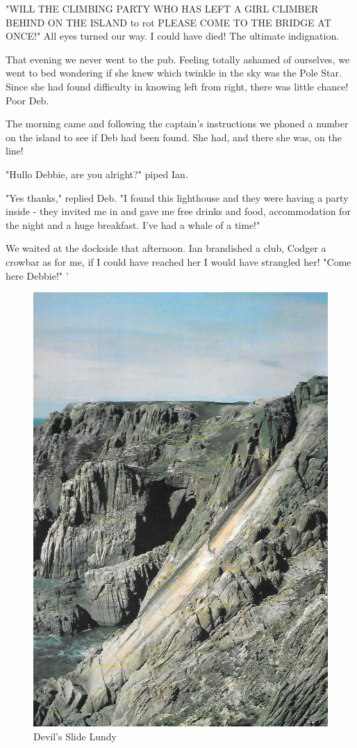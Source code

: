\documentclass[a5paper,openany,font 10pt]{scrbook}
\begin{document}
"WILL THE CLIMBING PARTY WHO HAS LEFT A GIRL CLIMBER BEHIND
ON THE ISLAND   to rot  PLEASE COME TO THE BRIDGE AT ONCE!"
All eyes turned our way. I could have died!  The ultimate
indignation.

That evening we never went to the pub. Feeling totally
ashamed of ourselves, we went to bed wondering if she knew which
twinkle in the sky was the Pole Star. Since she had found
difficulty in knowing left from right, there was little chance!
Poor Deb.

The morning came and following the captain's instructions we
phoned a number on the island to see if Deb had been found.  She
had, and there she was, on the line!

"Hullo Debbie, are you alright?" piped Ian.

"Yes thanks," replied Deb. "I found this lighthouse and they
were having a party inside - they invited me in and gave me free
drinks and food, accommodation for the night and a huge
breakfast. I've had a whale of a time!"

We waited at the dockside that afternoon. Ian brandished a
club, Codger a crowbar  as for me, if I could have reached her I
would have strangled her!
  "Come here Debbie!"
 '

\begin{figure}[htb]
\centering
\includegraphics[width=.9\linewidth]{./images/Devils_Slide_Lundy.jpg}
\caption{\label{fig:orgc618b34}
Devil's Slide Lundy}
\end{figure}
\end{document}

